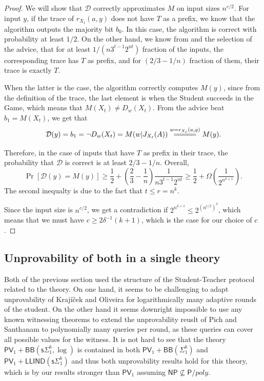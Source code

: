 \documentclass[11pt]{article}
\renewcommand{\P}{\mathsf{P}}
\newcommand{\NP}{\mathsf{NP}}
\newcommand{\PV}{\mathsf{PV}}
\theoremstyle{definition}
\theoremstyle{definition}
\theoremstyle{remark}
\begin{document}
\begin{proof}
We will show that $\mathcal{D}$ correctly approximates $M$ on input sizes $n^{c/2}$. For input $y$, if the trace of $r_{X_t}(a,y)$ does not have $T$ as a prefix, we know that the algorithm outputs the majority bit $b_0$. In this case, the algorithm is correct with probability at least $1/2$. On the other hand, we know from  and the selection of the advice, that for at least $1/(n3^{t-1}2^{nt})$ fraction of the inputs, the corresponding trace has $T$ as prefix, and for $(2/3-1/n)$ fraction of them, their trace is exactly $T$. 

When the latter is the case, the algorithm correctly computes $M(y)$, since from the definition of the trace, the last element is when the Student succeeds in the Game, which means that $M(X_t)\neq D_w(X_t)$. From the advice beat $b_1= M(X_t)$, we get that 
$$
\mathcal{D}(y)=b_1=\neg D_w(X_t)=M(w|J_{X_t}(A))\overset{w=r_{X_t}(a,y)}{=\joinrel=\joinrel=\joinrel=\joinrel=} M(y).
$$

Therefore, in the case of inputs that have $T$ as prefix in their trace, the probability that $\mathcal{D}$ is correct is at least $2/3-1/n$. Overall,
$$
\Pr[\mathcal{D}(y)=M(y)]\geq \frac{1}{2}+\left(\frac{2}{3}-\frac{1}{n}\right)\frac{1}{n3^{t-1}2^{nt}}\geq \frac{1}{2}+\Omega\left(\frac{1}{2^{n^{k+1}}}\right).
$$
The second inequalty is due to the fact that $t\leq r=n^k$.

Since the input size is $n^{c/2}$, we get a contradiction if $2^{n^{k+1}}\leq 2^{(n^{c/2})^\delta}$, which means that we must have $c\geq 2\delta^{-1}(k+1)$, which is the case for our choice of $c$.
\end{proof}

\subsection{Unprovability of both in a single theory}

Both of the previous section used the structure of the Student-Teacher protocol related to the theory. On one hand, it seems to be challenging to adapt unprovability of Krajíček and Oliveira for logarithmically many adaptive rounds of the student. On the other hand it seems downright impossible to use any known witnessing theorems to extend the unprovability reuslt of Pich and Santhanam to polynomially many queries per round, as these queries can cover all possible values for the witness. It is not hard to see that the theory $\PV_1+\mathsf{BB}(\mathsf{s}\Sigma^b_1,\log)$ is contained in both $\PV_1+\mathsf{BB}(\Sigma^b_1)$ and $\PV_1+\mathsf{LLIND}(\mathsf{s}\Sigma^b_1)$ and thus both unprovability results hold for this theory, which is by our results stronger than $\PV_1$ assuming $\NP\not \subseteq \P/poly$.
\end{document}
